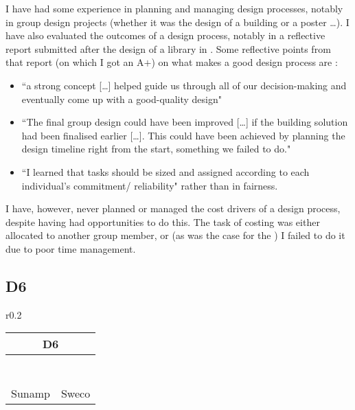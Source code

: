 I have had some experience in planning and managing design processes, notably in group design projects (whether it was the design of a building or a poster \ldots).
I have also evaluated the outcomes of a design process, notably in a reflective report submitted after the design of a library in \CASTitle.
Some reflective points from that report (on which I got an A$+$) on what makes a good design process are \citep{eklowCAS}:
\begin{itemize}
	\item ``a strong concept [\ldots] helped guide us through all of our decision-making and eventually come up with a good-quality design"
	\item ``The final group design could have been improved [\ldots] if the building solution had been finalised earlier [\ldots]. This could have been achieved by planning the design timeline right from the start, something we failed to do."
	\item ``I learned that tasks should be sized and assigned according to each individual’s commitment/ reliability" rather than in fairness.
\end{itemize}

I have, however, never planned or managed the cost drivers of a design process, despite having had opportunities to do this.
The task of costing was either allocated to another group member, or (as was the case for the \PRJTitle) I failed to do it due to poor time management.







\subsection*{D6}

\begin{wraptable}{r}{0.2\textwidth}
	\begin{tabular}{|ll|}
		\hline
		\multicolumn{2}{|c|}{\cellcolor[HTML]{F8A102}\textbf{D6 \master}} \\ \hline
		\DPA & \ConTechOne \\
		\HYD & \EnvBeh \\
		\DPB & \CAS \\
		\TPS & \DI \\
		\FMP & \PRJ \\
		\DST & \LAB \\
		\ISE & \CCSA \\
		Sunamp & Sweco \\ \hline
	\end{tabular}
\end{wraptable}

